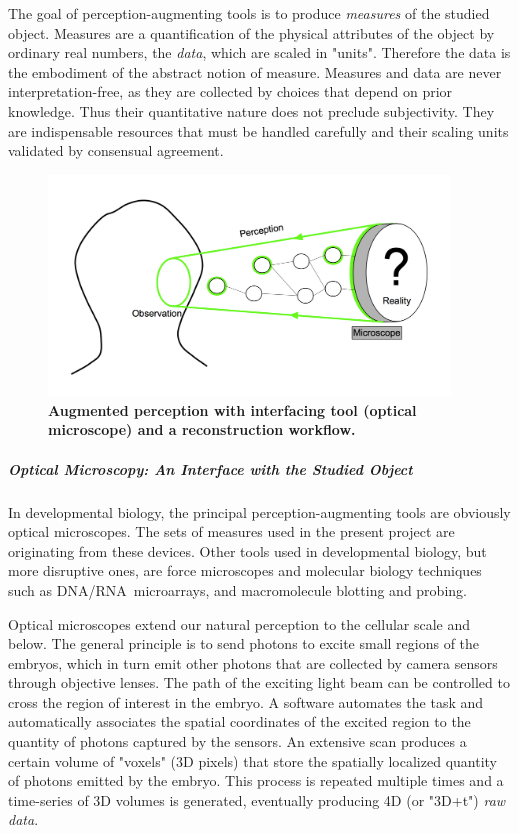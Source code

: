 The goal of perception-augmenting tools is to produce \textit{measures} of the studied object. Measures are a quantification of the physical attributes of the object by ordinary real numbers, the \textit{data}, which are scaled in "units". Therefore the data is the embodiment of the abstract notion of measure. Measures and data are never interpretation-free, as they are collected by choices that depend on prior knowledge. Thus their quantitative nature does not preclude subjectivity. They are indispensable resources that must be handled carefully and their scaling units validated by consensual agreement.
\begin{figure}
\begin{center}
\includegraphics[width=0.95\textwidth]{../../images/experimental_science/experimental_science_perception_augmented2.png}
\end{center}
\caption{\textbf{Augmented perception with interfacing tool (optical microscope) and a reconstruction workflow.}}
\label{experimental_science_perception_augmented}
\end{figure}

\subparagraph{Optical Microscopy: An Interface with the Studied Object}


In developmental biology, the principal perception-augmenting tools are obviously optical microscopes. The sets of measures used in the present project are originating from these devices. Other tools used in developmental biology, but more disruptive ones, are force microscopes and molecular biology techniques such as DNA/RNA microarrays, and macromolecule blotting and probing.

Optical microscopes extend our natural perception to the cellular scale and below. The general principle is to send photons to excite small regions of the embryos, which in turn emit other photons that are collected by camera sensors through objective lenses. The path of the exciting light beam can be controlled to cross the region of interest in the embryo. A software automates the task and automatically associates the spatial coordinates of the excited region to the quantity of photons captured by the sensors. An extensive scan produces a certain volume of "voxels" (3D pixels) that store the spatially localized quantity of photons emitted by the embryo. This process is repeated multiple times and a time-series of 3D volumes is generated, eventually producing 4D (or "3D+t") \textit{raw data}.

